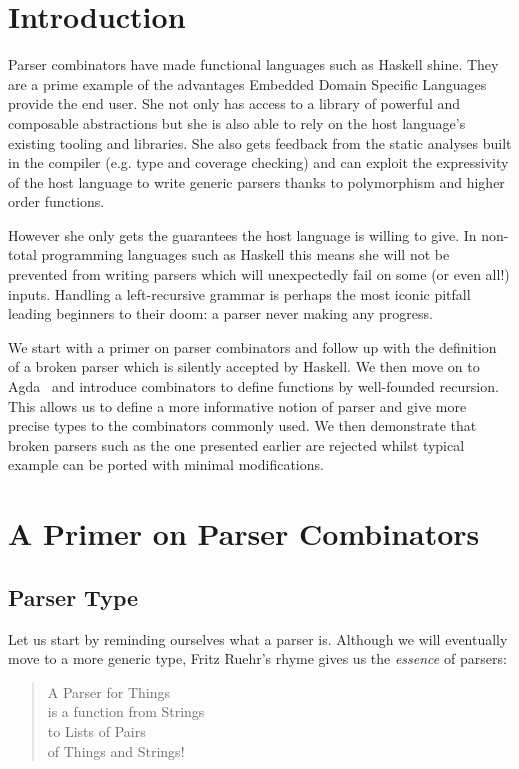 \documentclass[sigplan,review,anonymous]{acmart}\settopmatter{printfolios=true}
\begin{document}
\section{Introduction}

Parser combinators have made functional languages such as Haskell
shine. They are a prime example of the advantages Embedded Domain
Specific Languages provide the end user. She not only has access
to a library of powerful and composable abstractions but she is also
able to rely on the host language's existing tooling and libraries.
She also gets feedback from the static analyses built in the compiler
(e.g. type and coverage checking) and can exploit the expressivity
of the host language to write generic parsers thanks to polymorphism
and higher order functions.

However she only gets the guarantees the host language is willing
to give. In non-total programming languages such as Haskell this
means she will not be prevented from writing parsers which will
unexpectedly fail on some (or even all!) inputs. Handling a
left-recursive grammar is perhaps the most iconic pitfall leading
beginners to their doom: a parser never making any progress.

We start with a primer on parser combinators and follow up with the
definition of a broken parser which is silently accepted by Haskell.
We then move on to Agda~\cite{norell2009dependently} and introduce combinators to
define functions by well-founded recursion. This allows us to define
a more informative notion of parser and give more precise types to
the combinators commonly used. We then demonstrate that broken parsers
such as the one presented earlier are rejected whilst typical example
can be ported with minimal modifications.

\section{A Primer on Parser Combinators}

\subsection{Parser Type}

Let us start by reminding ourselves what a parser is. Although we
will eventually move to a more generic type, Fritz Ruehr's rhyme
gives us the \emph{essence} of parsers:

\begin{verse}
  A Parser for Things\\
  is a function from Strings\\
  to Lists of Pairs\\
  of Things and Strings!
\end{verse}
\end{document}
